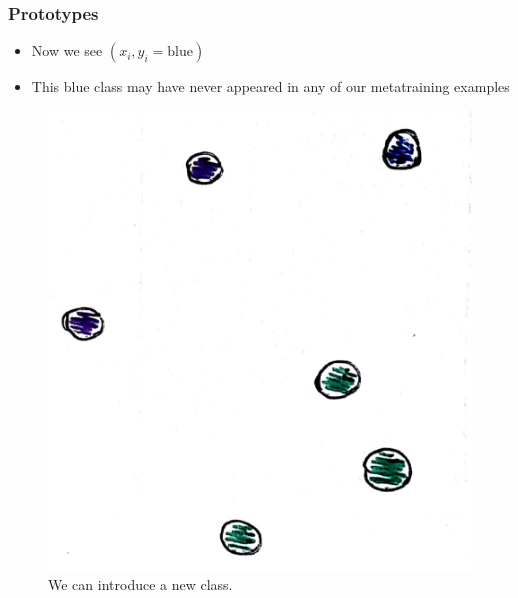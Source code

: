 \documentclass[10pt,mathserif]{beamer}
\begin{document}
\begin{frame}
  \frametitle{Prototypes}
 \begin{itemize}
   \item Now we see $\left(x_i, y_i = \text{blue}\right)$
 \item This blue class may have never appeared in any of our metatraining
   examples
 \end{itemize} 
\begin{figure}[ht]
  \centering
  \includegraphics[width=0.35\paperwidth]{figure/prototypes_4}
  \caption{We can introduce a new class.\label{fig:prototypes_4} }
\end{figure}
\end{frame}
\end{document}
